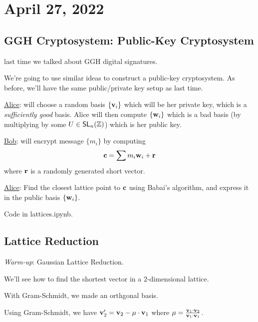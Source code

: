 \section{April 27, 2022}
\subsection{GGH Cryptosystem: Public-Key Cryptosystem}
\recall last time we talked about GGH digital signatures.

We're going to use similar ideas to construct a public-key cryptosystem. As before, we'll have the same public/private key setup as last time.

\ul{Alice}: will choose a random basis $\{\mathbf{v}_i\}$ which will be her private key, which is a \emph{sufficiently good} basis. Alice will then compute $\{\mathbf{w}_i\}$ which is a bad basis (by multiplying by some $U\in\mathsf{SL}_n(\mathbb Z)$) which is her public key.

\ul{Bob}: will encrypt message $\{m_i\}$ by computing
\[\mathbf{c} = \sum m_i \mathbf{w}_i + \mathbf{r}\]
where $\mathbf{r}$ is a randomly generated short vector.

\ul{Alice}: Find the closest lattice point to $\mathbf{c}$ using Babai's algorithm, and express it in the public basis $\{\mathbf{w}_i\}$.

Code in \textsf{lattices.ipynb}.

\subsection{Lattice Reduction}
\emph{Warm-up}: Gaussian Lattice Reduction.

We'll see how to find the shortest vector in a 2-dimensional lattice.

With Gram-Schmidt, we made an orthgonal basis.
\begin{center}
\end{center}

Using Gram-Schmidt, we have $\mathbf{v}_2' = \mathbf{v}_2 - \mu\cdot \mathbf{v}_1$ where $\mu = \frac{\mathbf{v}_1\cdot \mathbf{v}_2}{\mathbf{v}_1\cdot \mathbf{v}_1}$.

